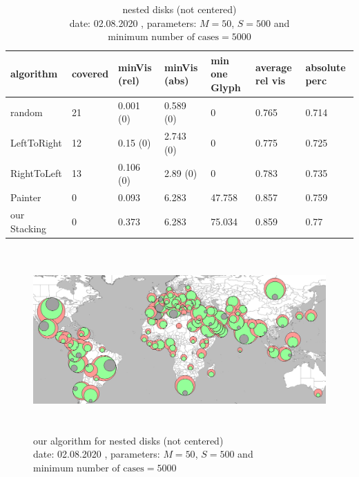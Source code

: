 \documentclass[a4paper,11pt]{article}
\begin{document}
\begin{table}[!h]
\begin{center}

    \begin{tabular}{| l || p{1.3cm} | p{1.7cm} | p{1.7cm} | p{1.5cm} | p{1.5cm} | p{1.5cm} |}
      \hline
      algorithm    & covered & minVis (rel) & minVis (abs) & min one Glyph & average rel vis & absolute perc \\
      \hline
      random       & 21      & 0.001 (0)    & 0.589 (0)    & 0             & 0.765           & 0.714         \\

      LeftToRight  & 12      & 0.15 (0)    & 2.743 (0)    & 0             & 0.775           & 0.725         \\

      RightToLeft  & 13      & 0.106 (0)    & 2.89 (0)     & 0             & 0.783           & 0.735         \\

      Painter      &  0       & {0.093}        & 6.283        & 47.758        & 0.857           & 0.759         \\

      our Stacking &  0       & { 0.373 }       & 6.283        & 75.034        & 0.859           & 0.77          \\

      \hline
    \end{tabular}
  \end{center}
  \caption{nested disks (not centered)\\
    date: 02.08.2020  , parameters: $M=50$, $S=500$ and $\text{minimum number of cases}=5000$ }
\end{table}

\begin{figure}[!t]
  \centering
  \includegraphics[height=7cm]{assets/HawaiianEval}
  \caption{our algorithm for nested disks (not centered)\\
    date: 02.08.2020  , parameters: $M=50$, $S=500$ and $\text{minimum number of cases}=5000$  }
\end{figure}
\end{document}
